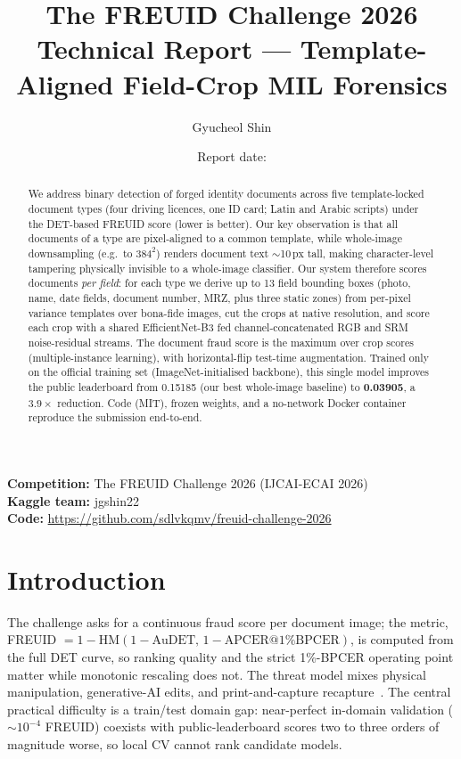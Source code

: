 \documentclass[11pt,a4paper]{article}
\title{%
  \textbf{The FREUID Challenge 2026}\\[0.4em]
  \large Technical Report --- Template-Aligned Field-Crop MIL Forensics
}
\author{Gyucheol Shin\\ \small \texttt{\contactemail}}
\date{Report date: \reportdate}
\newcommand{\kaggleteam}{jgshin22}
\begin{document}
\maketitle

\begin{abstract}
We address binary detection of forged identity documents across five
template-locked document types (four driving licences, one ID card; Latin and
Arabic scripts) under the DET-based FREUID score (lower is better). Our key
observation is that all documents of a type are pixel-aligned to a common
template, while whole-image downsampling (e.g.\ to $384^2$) renders document
text $\sim$10\,px tall, making character-level tampering physically invisible
to a whole-image classifier. Our system therefore scores documents
\emph{per field}: for each type we derive up to 13 field bounding boxes
(photo, name, date fields, document number, MRZ, plus three static zones)
from per-pixel variance templates over bona-fide images, cut the crops at
native resolution, and score each crop with a shared EfficientNet-B3 fed
channel-concatenated RGB and SRM noise-residual streams. The document fraud
score is the maximum over crop scores (multiple-instance learning), with
horizontal-flip test-time augmentation. Trained only on the official training
set (ImageNet-initialised backbone), this single model improves the public
leaderboard from 0.15185 (our best whole-image baseline) to \textbf{0.03905},
a $3.9\times$ reduction. Code (MIT), frozen weights, and a no-network Docker
container reproduce the submission end-to-end.
\end{abstract}

\noindent\textbf{Competition:} The FREUID Challenge 2026 (IJCAI-ECAI 2026)\\
\textbf{Kaggle team:} \kaggleteam\\
\textbf{Code:} \url{https://github.com/sdlvkqmv/freuid-challenge-2026}\\

\section{Introduction}
\label{sec:intro}
The challenge asks for a continuous fraud score per document image; the
metric, FREUID $=1-\mathrm{HM}(1-\mathrm{AuDET},\,1-\mathrm{APCER@1\%BPCER})$,
is computed from the full DET curve, so ranking quality and the strict
1\%-BPCER operating point matter while monotonic rescaling does not. The
threat model mixes physical manipulation, generative-AI edits, and
print-and-capture recapture~\cite{freuid2026}. The central practical
difficulty is a train/test domain gap: near-perfect in-domain validation
($\sim 10^{-4}$ FREUID) coexists with public-leaderboard scores two to three
orders of magnitude worse, so local CV cannot rank candidate models.
\end{document}
